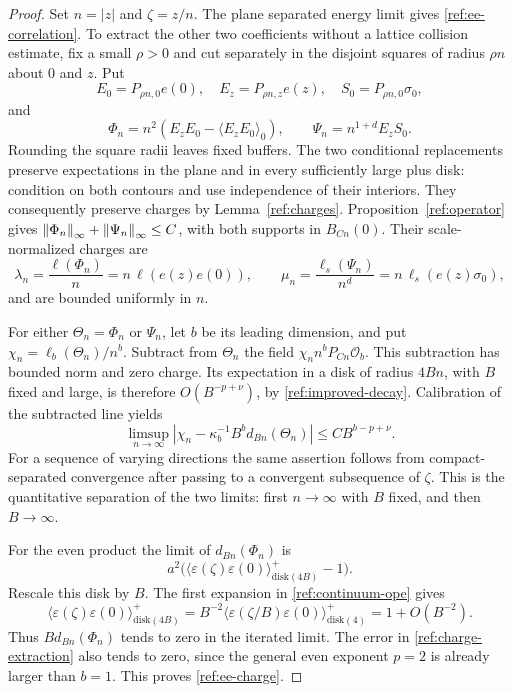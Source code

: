 \begin{proof}
Set $n=|z|$ and $\zeta=z/n$.  The plane separated energy limit gives
\eqref{ref:ee-correlation}.  To extract the other two coefficients without
a lattice collision estimate, fix a small $\rho>0$ and cut separately in
the disjoint squares of radius $\rho n$ about $0$ and $z$.  Put
\[
 E_0=P_{\rho n,0}e(0),\quad E_z=P_{\rho n,z}e(z),\quad
 S_0=P_{\rho n,0}\sigma_0,
\]
and
\[
 \Phi_n=n^2(E_zE_0-\langle E_zE_0\rangle_0),\qquad
 \Psi_n=n^{1+d}E_zS_0.
\]
Rounding the square radii leaves fixed buffers.  The two conditional
replacements preserve expectations in the plane and in every sufficiently
large plus disk: condition on both contours and use independence of their
interiors.  They consequently preserve charges by
Lemma~\ref{ref:charges}.  Proposition~\ref{ref:operator} gives
$\left\lVert\Phi_n\right\rVert_\infty+\left\lVert\Psi_n\right\rVert_\infty\le C$, with both supports in
$B_{Cn}(0)$.  Their scale-normalized charges are
\begin{equation}\label{ref:normalized-product-charges}
 \lambda_n=\frac{\ell(\Phi_n)}n=n\,\ell(e(z)e(0)),\qquad
 \mu_n=\frac{\ell_s(\Psi_n)}{n^d}=n\,\ell_s(e(z)\sigma_0),
\end{equation}
and are bounded uniformly in $n$.

For either $\Theta_n=\Phi_n$ or $\Psi_n$, let $b$ be its leading dimension,
and put $\chi_n=\ell_b(\Theta_n)/n^b$.  Subtract from $\Theta_n$ the field
$\chi_n n^bP_{Cn}\mathcal O_b$.  This subtraction has bounded norm and
zero charge.  Its expectation in a disk of radius $4Bn$, with $B$ fixed
and large, is therefore $O(B^{-p+\nu})$, by
\eqref{ref:improved-decay}.  Calibration of the subtracted line yields
\begin{equation}\label{ref:charge-extraction}
 \limsup_{n\to\infty}
 \left|\chi_n-\kappa_b^{-1}B^b d_{Bn}(\Theta_n)\right|
       \le CB^{b-p+\nu}.
\end{equation}
For a sequence of varying directions the same assertion follows from
compact-separated convergence after passing to a convergent subsequence
of $\zeta$.  This is the quantitative separation of the two limits: first
$n\to\infty$ with $B$ fixed, and then $B\to\infty$.

For the even product the limit of $d_{Bn}(\Phi_n)$ is
\[
 a^2\bigl(\langle\varepsilon(\zeta)\varepsilon(0)\rangle^+
                       _{\mathrm{disk}(4B)}-1\bigr).
\]
Rescale this disk by $B$.  The first expansion in
\eqref{ref:continuum-ope} gives
\[
 \langle\varepsilon(\zeta)\varepsilon(0)\rangle^+
                       _{\mathrm{disk}(4B)}
 =B^{-2}\langle\varepsilon(\zeta/B)\varepsilon(0)\rangle^+
                       _{\mathrm{disk}(4)}
 =1+O(B^{-2}).
\]
Thus $B d_{Bn}(\Phi_n)$ tends to zero in the iterated limit.  The error in
\eqref{ref:charge-extraction} also tends to zero, since the general even
exponent $p=2$ is already larger than $b=1$.  This proves
\eqref{ref:ee-charge}.


\end{proof}
